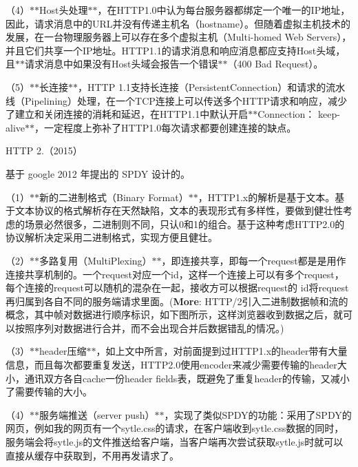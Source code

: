 （4）$\ast$$\ast$\+Host头处理$\ast$$\ast$，在\+H\+T\+T\+P1.0中认为每台服务器都绑定一个唯一的\+I\+P地址，因此，请求消息中的\+U\+R\+L并没有传递主机名（hostname）。但随着虚拟主机技术的发展，在一台物理服务器上可以存在多个虚拟主机（\+Multi-\/homed Web Servers），并且它们共享一个\+I\+P地址。\+H\+T\+T\+P1.1的请求消息和响应消息都应支持\+Host头域，且$\ast$$\ast$请求消息中如果没有\+Host头域会报告一个错误$\ast$$\ast$（400 Bad Request）。

（5）$\ast$$\ast$长连接$\ast$$\ast$，\+H\+T\+TP 1.\+1支持长连接（\+Persistent\+Connection）和请求的流水线（\+Pipelining）处理，在一个\+T\+C\+P连接上可以传送多个\+H\+T\+T\+P请求和响应，减少了建立和关闭连接的消耗和延迟，在\+H\+T\+T\+P1.1中默认开启$\ast$$\ast$\+Connection： keep-\/alive$\ast$$\ast$，一定程度上弥补了\+H\+T\+T\+P1.0每次请求都要创建连接的缺点。


\begin{DoxyEnumerate}
\item H\+T\+TP 2.（2015）
\end{DoxyEnumerate}

基于 google 2012 年提出的 S\+P\+DY 设计的。

（1）$\ast$$\ast$新的二进制格式（\+Binary Format）$\ast$$\ast$，\+H\+T\+T\+P1.x的解析是基于文本。基于文本协议的格式解析存在天然缺陷，文本的表现形式有多样性，要做到健壮性考虑的场景必然很多，二进制则不同，只认0和1的组合。基于这种考虑\+H\+T\+T\+P2.0的协议解析决定采用二进制格式，实现方便且健壮。

（2）$\ast$$\ast$多路复用（\+Multi\+Plexing）$\ast$$\ast$，即连接共享，即每一个request都是是用作连接共享机制的。一个request对应一个id，这样一个连接上可以有多个request，每个连接的request可以随机的混杂在一起，接收方可以根据request的 id将request再归属到各自不同的服务端请求里面。({\bfseries More}\+: H\+T\+T\+P/2引入二进制数据帧和流的概念，其中帧对数据进行顺序标识，如下图所示，这样浏览器收到数据之后，就可以按照序列对数据进行合并，而不会出现合并后数据错乱的情况。)

（3）$\ast$$\ast$header压缩$\ast$$\ast$，如上文中所言，对前面提到过\+H\+T\+T\+P1.x的header带有大量信息，而且每次都要重复发送，\+H\+T\+T\+P2.0使用encoder来减少需要传输的header大小，通讯双方各自cache一份header fields表，既避免了重复header的传输，又减小了需要传输的大小。

（4）$\ast$$\ast$服务端推送（server push）$\ast$$\ast$，实现了类似\+S\+P\+D\+Y的功能：采用了\+S\+P\+D\+Y的网页，例如我的网页有一个sytle.css的请求，在客户端收到sytle.\+css数据的同时，服务端会将sytle.\+js的文件推送给客户端，当客户端再次尝试获取sytle.\+js时就可以直接从缓存中获取到，不用再发请求了。


